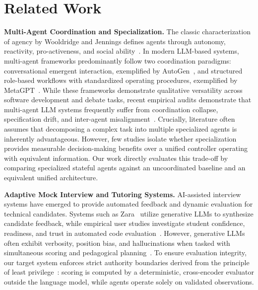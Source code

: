 \section{Related Work}\label{sec:related}
\noindent\textbf{Multi-Agent Coordination and Specialization.} The classic characterization of agency by Wooldridge and Jennings defines agents through autonomy, reactivity, pro-activeness, and social ability~\cite{wj95}. In modern LLM-based systems, multi-agent frameworks predominantly follow two coordination paradigms: conversational emergent interaction, exemplified by AutoGen~\cite{autogen}, and structured role-based workflows with standardized operating procedures, exemplified by MetaGPT~\cite{metagpt}. While these frameworks demonstrate qualitative versatility across software development and debate tasks, recent empirical audits demonstrate that multi-agent LLM systems frequently suffer from coordination collapse, specification drift, and inter-agent misalignment~\cite{mast,resil,masfire}. Crucially, literature often assumes that decomposing a complex task into multiple specialized agents is inherently advantageous. However, few studies isolate whether specialization provides measurable decision-making benefits over a unified controller operating with equivalent information. Our work directly evaluates this trade-off by comparing specialized stateful agents against an uncoordinated baseline and an equivalent unified architecture.

\noindent\textbf{Adaptive Mock Interview and Tutoring Systems.} AI-assisted interview systems have emerged to provide automated feedback and dynamic evaluation for technical candidates. Systems such as Zara~\cite{zara} utilize generative LLMs to synthesize candidate feedback, while empirical user studies investigate student confidence, readiness, and trust in automated code evaluation~\cite{virt,chase}. However, generative LLMs often exhibit verbosity, position bias, and hallucinations when tasked with simultaneous scoring and pedagogical planning~\cite{judge}. To ensure evaluation integrity, our target system enforces strict authority boundaries derived from the principle of least privilege~\cite{ss75}: scoring is computed by a deterministic, cross-encoder evaluator outside the language model, while agents operate solely on validated observations.

